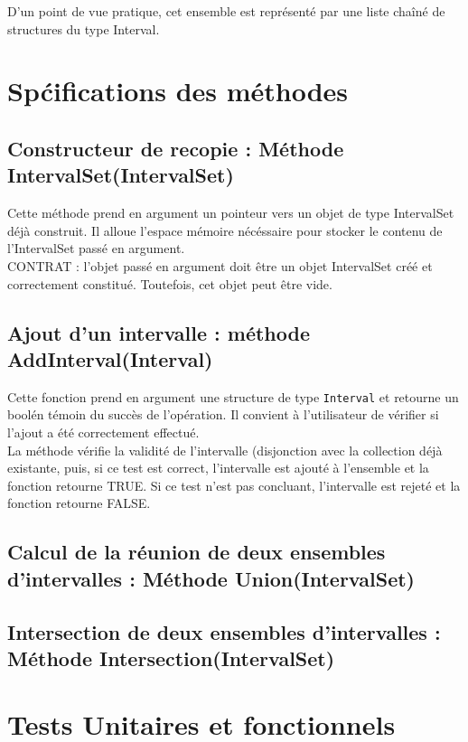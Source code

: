 \documentclass[a4paper,french,10pt,twoside]{article}
\begin{document}
D'un point de vue pratique, cet ensemble est repr\'esent\'e par une liste chaîn\'e de structures du type Interval.


\section{Sp\'cifications des m\'ethodes}

\subsection{Constructeur de recopie :  M\'ethode IntervalSet(IntervalSet)}

Cette m\'ethode prend en argument un pointeur vers un objet de type IntervalSet d\'ejà construit. Il alloue l'espace m\'emoire n\'ec\'essaire pour stocker le contenu de l'IntervalSet pass\'e en argument.\\
CONTRAT : l'objet pass\'e en argument doit être un objet IntervalSet cr\'e\'e et correctement constitu\'e. Toutefois, cet objet peut être vide.

\subsection{Ajout d'un intervalle : m\'ethode AddInterval(Interval) }
Cette fonction prend en argument une structure de type \verb!Interval! et retourne un bool\'en t\'emoin du succès de l'op\'eration. Il convient à l'utilisateur de v\'erifier si l'ajout a \'et\'e correctement effectu\'e.\\
La m\'ethode v\'erifie la validit\'e de l'intervalle (disjonction avec la collection d\'ejà existante, puis, si ce test est correct, l'intervalle est ajout\'e à l'ensemble et la fonction retourne TRUE. Si ce test n'est pas concluant, l'intervalle est rejet\'e et la fonction retourne FALSE.

\subsection{Calcul de la r\'eunion de deux ensembles d'intervalles : M\'ethode Union(IntervalSet)}

\subsection{Intersection de deux ensembles d'intervalles : M\'ethode Intersection(IntervalSet)}

\section{Tests Unitaires et fonctionnels}
\end{document}
